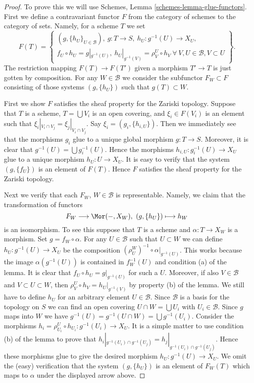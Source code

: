 \begin{proof}
To prove this we will use Schemes, Lemma \ref{schemes-lemma-glue-functors}.
First we define a contravariant functor $F$ from the category of schemes
to the category of sets. Namely, for a scheme $T$ we set
$$
F(T) =
\left\{
\begin{matrix}
(g, \{h_U\}_{U \in \mathcal{B}}),
\ g : T \to S, \ h_U : g^{-1}(U) \to X_U, \\
f_U \circ h_U = g|_{g^{-1}(U)},
\ h_U|_{g^{-1}(V)} = \rho^U_V \circ h_V
\ \forall\ V, U \in \mathcal{B}, V \subset U
\end{matrix}
\right\}.
$$
The restriction mapping $F(T) \to F(T')$ given a morphism
$T' \to T$ is just gotten by composition.
For any $W \in \mathcal{B}$ we consider the subfunctor
$F_W \subset F$ consisting of those systems $(g, \{h_U\})$
such that $g(T) \subset W$.

\medskip\noindent
First we show $F$ satisfies the sheaf property for the Zariski topology.
Suppose that $T$ is a scheme, $T = \bigcup V_i$ is an open covering,
and $\xi_i \in F(V_i)$ is an element such that
$\xi_i|_{V_i \cap V_j} = \xi_j|_{V_i \cap V_j}$.
Say $\xi_i = (g_i, \{h_{i, U}\})$. Then we immediately see that
the morphisms $g_i$ glue to a unique global morphism
$g : T \to S$. Moreover, it is clear that
$g^{-1}(U) = \bigcup g_i^{-1}(U)$. Hence the morphisms
$h_{i, U} : g_i^{-1}(U) \to X_U$ glue to a unique morphism
$h_U : U \to X_U$. It is easy to verify that the system
$(g, \{f_U\})$ is an element of $F(T)$. Hence $F$ satisfies the
sheaf property for the Zariski topology.

\medskip\noindent
Next we verify that each $F_W$, $W \in \mathcal{B}$ is representable.
Namely, we claim that the transformation of functors
$$
F_W \longrightarrow \Mor(-, X_W), \ (g, \{h_U\}) \longmapsto h_W
$$
is an isomorphism. To see this suppose that $T$ is a scheme and
$\alpha : T \to X_W$ is a morphism. Set $g = f_W \circ \alpha$.
For any $U \in \mathcal{B}$ such that $U \subset W$ we can
define $h_U : g^{-1}(U) \to X_U$ be the composition
$(\rho^W_U)^{-1} \circ \alpha|_{g^{-1}(U)}$. This works because
the image $\alpha(g^{-1}(U))$ is contained in $f_W^{-1}(U)$ and
condition (a) of the lemma. It is clear that
$f_U \circ h_U = g|_{g^{-1}(U)}$ for such a $U$.
Moreover, if also $V \in \mathcal{B}$ and $V \subset U \subset W$,
then $\rho^U_V \circ h_V = h_U|_{g^{-1}(V)}$ by property (b)
of the lemma. We still have to define $h_U$ for an arbitrary
element $U \in \mathcal{B}$. Since $\mathcal{B}$ is a basis for
the topology on $S$ we can find an open covering
$U \cap W = \bigcup U_i$ with $U_i \in \mathcal{B}$. Since $g$ maps into $W$
we have
$g^{-1}(U) = g^{-1}(U \cap W) = \bigcup g^{-1}(U_i)$.
Consider the morphisms
$h_i = \rho^U_{U_i} \circ h_{U_i} : g^{-1}(U_i) \to X_U$.
It is a simple matter to use condition (b) of the lemma
to prove that
$h_i|_{g^{-1}(U_i) \cap g^{-1}(U_j)} = h_j|_{g^{-1}(U_i) \cap g^{-1}(U_j)}$.
Hence these morphisms glue to give the desired morphism
$h_U : g^{-1}(U) \to X_U$. We omit the (easy) verification that
the system $(g, \{h_U\})$ is an element of $F_W(T)$ which
maps to $\alpha$ under the displayed arrow above.


\end{proof}
